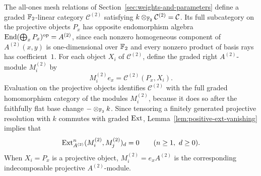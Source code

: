The all-ones mesh relations of Section~\ref{sec:weights-and-parameters} define a graded $\mathbb F_2$-linear category $\mathcal C^{(2)}$ satisfying $k\otimes_{\mathbb F_2}\mathcal C^{(2)}=\mathcal C$. Its full subcategory on the projective objects $P_x$ has opposite endomorphism algebra $\operatorname{End}(\bigoplus_x P_x)^{\mathrm{op}}=A^{(2)}$, since each nonzero homogeneous component of $A^{(2)}(x,y)$ is one-dimensional over $\mathbb F_2$ and every nonzero product of basis rays has coefficient~$1$. For each object $X_i$ of $\mathcal C^{(2)}$, define the graded right $A^{(2)}$-module $M_i^{(2)}$ by
\[
  M_i^{(2)}e_x=\mathcal C^{(2)}(P_x,X_i).
\]
Evaluation on the projective objects identifies $\mathcal C^{(2)}$ with the full graded homomorphism category of the modules $M_i^{(2)}$, because it does so after the faithfully flat base change $-\otimes_{\mathbb F_2}k$. Since tensoring a finitely generated projective resolution with $k$ commutes with graded $\operatorname{Ext}$, Lemma~\ref{lem:positive-ext-vanishing} implies that
\begin{equation}
  \Ext^n_{A^{(2)}}(M_i^{(2)},M_j^{(2)})_d=0\qquad(n\geq1,\ d\geq0).
  \label{eq:prime-field-ext-vanishing}
\end{equation}
When $X_i=P_x$ is a projective object, $M_i^{(2)}=e_xA^{(2)}$ is the corresponding indecomposable projective $A^{(2)}$-module.

